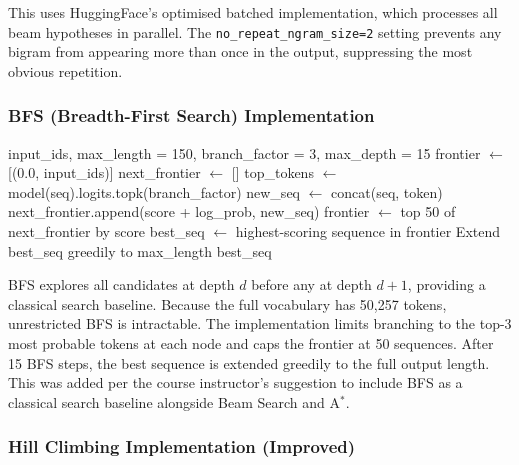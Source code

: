 \documentclass[12pt]{article}
\begin{document}
	This uses HuggingFace's optimised batched implementation, which processes all beam hypotheses in parallel. The \texttt{no\_repeat\_ngram\_size=2} setting prevents any bigram from appearing more than once in the output, suppressing the most obvious repetition.
	
	\subsubsection{BFS (Breadth-First Search) Implementation}
	
	\begin{algorithm}[H]
		\caption{Breadth-First Search (depth-limited)}
		\label{alg:bfs}
		\begin{algorithmic}[1]
			\Require input\_ids, max\_length = 150, branch\_factor = 3, max\_depth = 15
			\State frontier $\leftarrow$ [(0.0, input\_ids)]
			\State next\_frontier $\leftarrow$ []
			\State top\_tokens $\leftarrow$ model(seq).logits.topk(branch\_factor)
			\State new\_seq $\leftarrow$ concat(seq, token)
			\State next\_frontier.append(score + log\_prob, new\_seq)
			\EndFor
			\EndFor
			\State frontier $\leftarrow$ top 50 of next\_frontier by score
			\EndFor
			\State best\_seq $\leftarrow$ highest-scoring sequence in frontier
			\State Extend best\_seq greedily to max\_length
			\Return best\_seq
		\end{algorithmic}
	\end{algorithm}
	
	BFS explores all candidates at depth $d$ before any at depth $d+1$, providing a classical search baseline. Because the full vocabulary has 50,257 tokens, unrestricted BFS is intractable. The implementation limits branching to the top-3 most probable tokens at each node and caps the frontier at 50 sequences. After 15 BFS steps, the best sequence is extended greedily to the full output length. This was added per the course instructor's suggestion to include BFS as a classical search baseline alongside Beam Search and A$^*$.
	
	\subsubsection{Hill Climbing Implementation (Improved)}
	
\end{document}
